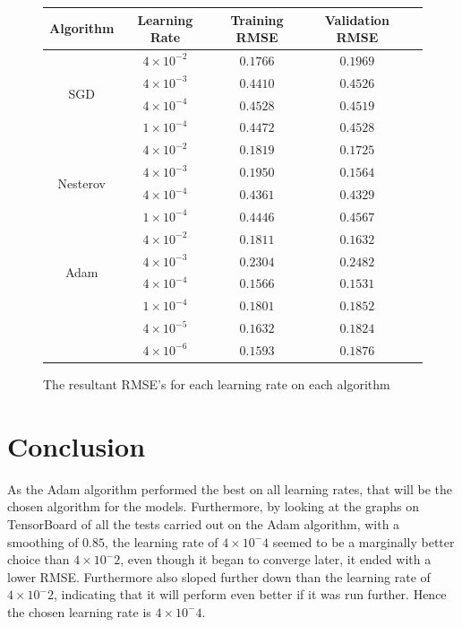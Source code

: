 \documentclass[12pt,a4paper,oneside,oldfontcommands]{memoir}
\begin{document}
\begin{figure}[H]
    \centering
    \begin{tabular}{ |c|c|c|c|c| } 
    \hline
    Algorithm & Learning Rate & Training RMSE & Validation RMSE \\
    \hline
    \multirow{4}{4em}{SGD}
    & \(4\times10^{-2}\) & \(0.1766\) & \(0.1969\)\\ 
    & \(4\times10^{-3}\) & \(0.4410\) & \(0.4526\)\\ 
    & \(4\times10^{-4}\) & \(0.4528\) & \(0.4519\)\\ 
    & \(1\times10^{-4}\) & \(0.4472\) & \(0.4528\)\\
    \hline
    \multirow{4}{4em}{Nesterov}
    & \(4\times10^{-2}\) & \(0.1819\) & \(0.1725\)\\ 
    & \(4\times10^{-3}\) & \(0.1950\) & \(0.1564\)\\ 
    & \(4\times10^{-4}\) & \(0.4361\) & \(0.4329\)\\ 
    & \(1\times10^{-4}\) & \(0.4446\) & \(0.4567\)\\
    \hline
    \multirow{4}{4em}{Adam}
    & \(4\times10^{-2}\) & \(0.1811\) & \(0.1632\)\\ 
    & \(4\times10^{-3}\) & \(0.2304\) & \(0.2482\)\\ 
    & \(4\times10^{-4}\) & \(0.1566\) & \(0.1531\)\\ 
    & \(1\times10^{-4}\) & \(0.1801\) & \(0.1852\)\\
    & \(4\times10^{-5}\) & \(0.1632\) & \(0.1824\)\\ 
    & \(4\times10^{-6}\) & \(0.1593\) & \(0.1876\)\\
    \hline
    \end{tabular}
    \caption{The resultant RMSE's for each learning rate on each algorithm}
    \label{fig:learning_rates_table}
\end{figure}

\section{Conclusion} 
As the Adam algorithm performed the best on all learning rates, that will be the chosen algorithm for the models. Furthermore, by looking at the graphs on TensorBoard of all the tests carried out on the Adam algorithm, with a smoothing of \(0.85\), the learning rate of \(4\times{10^-4}\) seemed to be a marginally better choice than \(4\times{10^-2}\), even though it began to converge later, it ended with a lower RMSE. Furthermore also sloped further down than the learning rate of \(4\times{10^-2}\), indicating that it will perform even better if it was run further. Hence the chosen learning rate is \(4\times{10^-4}\).
\end{document}
